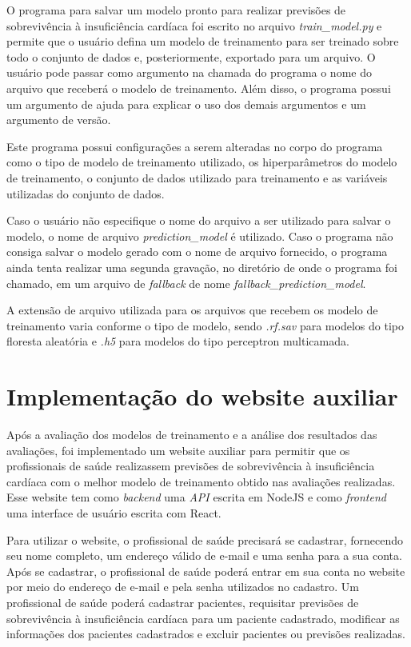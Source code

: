 O programa para salvar um modelo pronto para realizar previsões de sobrevivência à insuficiência cardíaca foi escrito no arquivo \textit{train\_model.py} e permite que o usuário defina um modelo de treinamento para ser treinado sobre todo o conjunto de dados \cite{larxel_dataset} e, posteriormente, exportado para um arquivo. O usuário pode passar como argumento na chamada do programa o nome do arquivo que receberá o modelo de treinamento. Além disso, o programa possui um argumento de ajuda para explicar o uso dos demais argumentos e um argumento de versão.

Este programa possui configurações a serem alteradas no corpo do programa como o tipo de modelo de treinamento utilizado, os hiperparâmetros do modelo de treinamento, o conjunto de dados utilizado para treinamento e as variáveis utilizadas do conjunto de dados.

Caso o usuário não especifique o nome do arquivo a ser utilizado para salvar o modelo, o nome de arquivo \textit{prediction\_model} é utilizado. Caso o programa não consiga salvar o modelo gerado com o nome de arquivo fornecido, o programa ainda tenta realizar uma segunda gravação, no diretório de onde o programa foi chamado, em um arquivo de \textit{fallback} de nome \textit{fallback\_prediction\_model}.

A extensão de arquivo utilizada para os arquivos que recebem os modelo de treinamento varia conforme o tipo de modelo, sendo \textit{.rf.sav} para modelos do tipo floresta aleatória e \textit{.h5} para modelos do tipo perceptron multicamada.

\section{Implementação do website auxiliar}

Após a avaliação dos modelos de treinamento e a análise dos resultados das avaliações, foi implementado um website auxiliar para permitir que os profissionais de saúde realizassem previsões de sobrevivência à insuficiência cardíaca com o melhor modelo de treinamento obtido nas avaliações realizadas. Esse website tem como \textit{backend} uma \textit{API} escrita em NodeJS e como \textit{frontend} uma interface de usuário escrita com React.

Para utilizar o website, o profissional de saúde precisará se cadastrar, fornecendo seu nome completo, um endereço válido de e-mail e uma senha para a sua conta. Após se cadastrar, o profissional de saúde poderá entrar em sua conta no website por meio do endereço de e-mail e pela senha utilizados no cadastro. Um profissional de saúde poderá cadastrar pacientes, requisitar previsões de sobrevivência à insuficiência cardíaca para um paciente cadastrado, modificar as informações dos pacientes cadastrados e excluir pacientes ou previsões realizadas.

